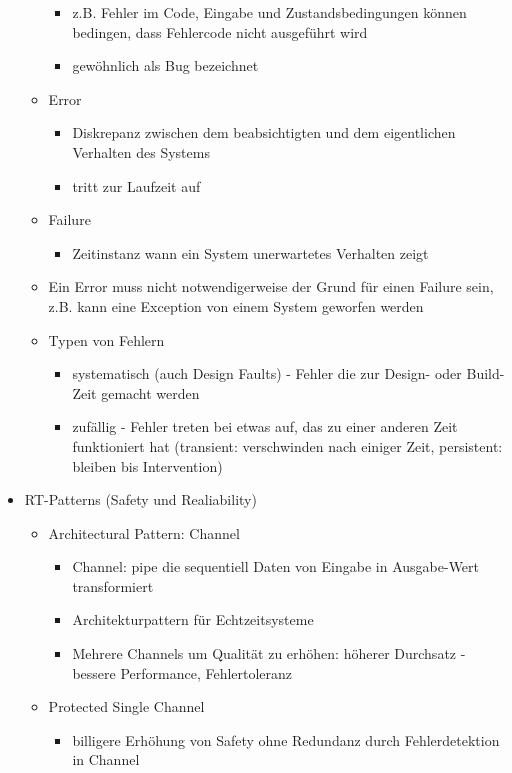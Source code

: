 \documentclass[paper=a4, fontsize=11pt]{scrartcl} %
\numberwithin{equation}{section} %
\numberwithin{figure}{section} %
\numberwithin{table}{section} %
\begin{document}
\begin{itemize}
\begin{itemize}
\begin{itemize}
      \item z.B. Fehler im Code, Eingabe und Zustandsbedingungen können bedingen, dass Fehlercode nicht ausgeführt wird
      \item gewöhnlich als Bug bezeichnet
    \end{itemize}
    \item Error
    \begin{itemize}
      \item Diskrepanz zwischen dem beabsichtigten und dem eigentlichen Verhalten des Systems
      \item tritt zur Laufzeit auf
    \end{itemize}
    \item Failure
    \begin{itemize}
      \item Zeitinstanz wann ein System unerwartetes Verhalten zeigt
    \end{itemize}
    \item Ein Error muss nicht notwendigerweise der Grund für einen Failure sein, z.B. kann eine Exception von einem System geworfen werden
    \item Typen von Fehlern
    \begin{itemize}
      \item systematisch (auch Design Faults) - Fehler die zur Design- oder Build-Zeit gemacht werden
      \item zufällig - Fehler treten bei etwas auf, das zu einer anderen Zeit funktioniert hat (transient: verschwinden nach einiger Zeit, persistent: bleiben bis Intervention)
    \end{itemize}
  \end{itemize}
  \item RT-Patterns (Safety und Realiability)
  \begin{itemize}
    \item Architectural Pattern: Channel
    \begin{itemize}
      \item Channel: pipe die sequentiell Daten von Eingabe in Ausgabe-Wert transformiert
      \item Architekturpattern für Echtzeitsysteme
      \item Mehrere Channels um Qualität zu erhöhen: höherer Durchsatz - bessere Performance, Fehlertoleranz
    \end{itemize}
    \item Protected Single Channel
    \begin{itemize}
      \item billigere Erhöhung von Safety ohne Redundanz durch Fehlerdetektion in Channel

\end{itemize}
\end{itemize}
\end{itemize}
\end{document}

